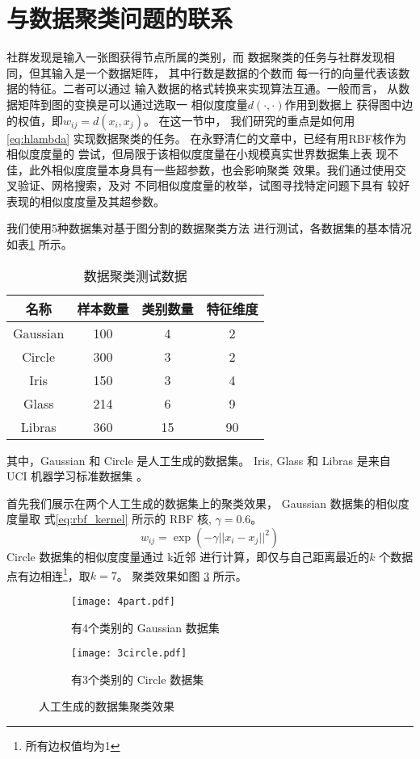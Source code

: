 \section{与数据聚类问题的联系}
\label{sec:data_clustering}
社群发现是输入一张图获得节点所属的类别，而
数据聚类的任务与社群发现相同，但其输入是一个数据矩阵，
其中行数是数据的个数而
每一行的向量代表该数据的特征。二者可以通过
输入数据的格式转换来实现算法互通。一般而言，
从数据矩阵到图的变换是可以通过选取一
相似度度量$d(\cdot,\cdot)$作用到数据上
获得图中边的权值，即$w_{ij}=d(x_i, x_j)$。
在这一节中，
我们研究的重点是如何用
\eqref{eq:hlambda} 实现数据聚类的任务。
在永野清仁的文章中\cite{mac}，已经有用RBF核作为相似度度量的
尝试，但局限于该相似度度量在小规模真实世界数据集上表
现不佳，此外相似度度量本身具有一些超参数，也会影响聚类
效果。我们通过使用交叉验证、网格搜索，及对
不同相似度度量的枚举，试图寻找特定问题下具有
较好表现的相似度度量及其超参数。

我们使用5种数据集对基于图分割的数据聚类方法
进行测试，各数据集的基本情况如表\ref{tab:clustering_dataset}
所示。
\begin{table}[!ht]
  \centering
  \begin{tabular}{|c|c|c|c|}
    \toprule
    名称 & 样本数量 & 类别数量 & 特征维度 \\
    \midrule
    Gaussian & 100 & 4 & 2 \\
    Circle & 300 & 3 & 2 \\
    Iris & 150 & 3 & 4 \\
    Glass & 214 & 6 & 9 \\
    Libras & 360 & 15 & 90 \\
    \bottomrule
  \end{tabular}
  \caption{数据聚类测试数据}\label{tab:clustering_dataset}
\end{table}
其中，Gaussian 和 Circle 是人工生成的数据集。
Iris, Glass 和 Libras 是来自 UCI 机器学习标准数据集
\cite{Dua:2019}。

首先我们展示在两个人工生成的数据集上的聚类效果，
Gaussian 数据集的相似度度量取 式\ref{eq:rbf_kernel} 所示的 RBF 核,
$\gamma=0.6$。
\begin{equation}\label{eq:rbf_kernel}
  w_{ij}=\exp(-\gamma ||x_i-x_j||^2)
\end{equation}
Circle 数据集的相似度度量通过 k近邻 进行计算，即仅与自己距离最近的$k$
个数据点有边相连\footnote{所有边权值均为1}，取$k=7$。
聚类效果如图 \ref{fig:artificial_dataset_effect} 所示。

\begin{figure}[!ht]
  \begin{subfigure}[b]{\linewidth}
  \texttt{[image: 4part.pdf]}
  \caption{有4个类别的 Gaussian 数据集}
  \label{fig:4p}
\end{subfigure}
\begin{subfigure}[b]{\linewidth}
  \texttt{[image: 3circle.pdf]}
  \caption{有3个类别的 Circle 数据集}
  \label{fig:3c}
\end{subfigure}
\caption{人工生成的数据集聚类效果}
\label{fig:artificial_dataset_effect}
\end{figure}

